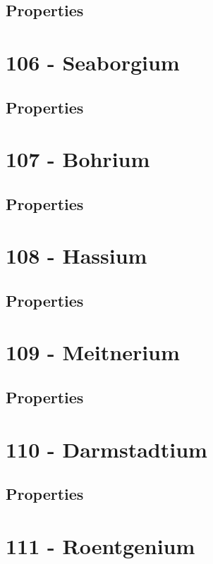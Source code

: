\documentclass{book}
\begin{document}
\subsection{Properties}

\section{106 - Seaborgium}
\label{sec:elem-seaborgium}
\subsection{Properties}

\section{107 - Bohrium}
\label{sec:elem-bohrium}
\subsection{Properties}

\section{108 - Hassium}
\label{sec:elem-hassium}
\subsection{Properties}

\section{109 - Meitnerium}
\label{sec:elem-meitnerium}
\subsection{Properties}

\section{110 - Darmstadtium}
\label{sec:elem-darmstadtium}
\subsection{Properties}

\section{111 - Roentgenium}
\label{sec:elem-roentgenium}
\end{document}
